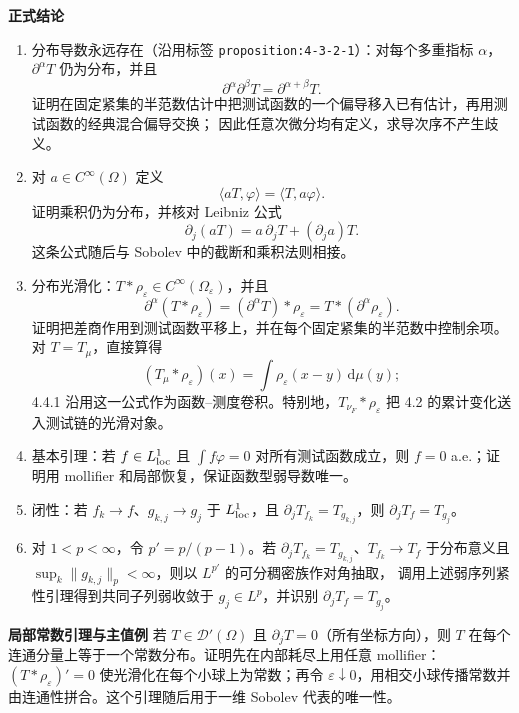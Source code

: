 \documentclass[11pt,a4paper]{ctexart}
\newcommand{\eps}{\varepsilon}
\newcommand{\dd}{\,\mathrm d}
\newcommand{\planitem}[1]{\par\smallskip\noindent\textcolor{deepblue}{\textbf{#1}}\quad}
\begin{document}
\planitem{正式结论}
\begin{enumerate}
\item 分布导数永远存在（沿用标签 \texttt{proposition:4-3-2-1}）：对每个多重指标 $\alpha$，$\partial^\alpha T$ 仍为分布，并且
\[
 \partial^\alpha\partial^\beta T=\partial^{\alpha+\beta}T.
\]
证明在固定紧集的半范数估计中把测试函数的一个偏导移入已有估计，再用测试函数的经典混合偏导交换；
因此任意次微分均有定义，求导次序不产生歧义。
\item 对 $a\in C^\infty(\Omega)$ 定义
\[
\langle aT,\varphi\rangle=\langle T,a\varphi\rangle.
\]
证明乘积仍为分布，并核对 Leibniz 公式
\[
\partial_j(aT)=a\,\partial_jT+(\partial_ja)T.
\]
这条公式随后与 Sobolev 中的截断和乘积法则相接。
\item 分布光滑化：$T*\rho_\eps\in C^\infty(\Omega_\eps)$，并且
\[
\partial^\alpha(T*\rho_\eps)
=(\partial^\alpha T)*\rho_\eps
=T*(\partial^\alpha\rho_\eps).
\]
证明把差商作用到测试函数平移上，并在每个固定紧集的半范数中控制余项。对 $T=T_\mu$，直接算得
\[
(T_\mu*\rho_\eps)(x)=\int\rho_\eps(x-y)\dd\mu(y);
\]
4.4.1 沿用这一公式作为函数--测度卷积。特别地，$T_{\nu_F}*\rho_\eps$ 把 4.2 的累计变化送入测试链的光滑对象。
\item 基本引理：若 $f\in L^1_{\rm loc}$ 且 $\int f\varphi=0$ 对所有测试函数成立，则 $f=0$ a.e.；证明用 mollifier 和局部恢复，保证函数型弱导数唯一。
\item 闭性：若 $f_k\to f$、$g_{k,j}\to g_j$ 于 $L^1_{\rm loc}$，且 $\partial_jT_{f_k}=T_{g_{k,j}}$，则 $\partial_jT_f=T_{g_j}$。
\item 对 $1<p<\infty$，令 $p'=p/(p-1)$。若
$\partial_jT_{f_k}=T_{g_{k,j}}$、$T_{f_k}\to T_f$ 于分布意义且
$\sup_k\|g_{k,j}\|_p<\infty$，则以 $L^{p'}$ 的可分稠密族作对角抽取，
调用上述弱序列紧性引理得到共同子列弱收敛于 $g_j\in L^p$，并识别
$\partial_jT_f=T_{g_j}$。
\end{enumerate}
\planitem{局部常数引理与主值例}
若 $T\in\mathcal D'(\Omega)$ 且 $\partial_jT=0$（所有坐标方向），则 $T$ 在每个连通分量上等于一个常数分布。证明先在内部耗尽上用任意 mollifier：$(T*\rho_\eps)'=0$ 使光滑化在每个小球上为常数；再令 $\eps\downarrow0$，用相交小球传播常数并由连通性拼合。这个引理随后用于一维 Sobolev 代表的唯一性。
\end{document}
